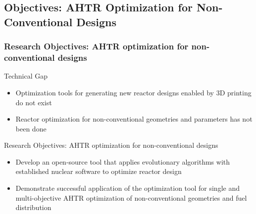 \subsection{Objectives: AHTR Optimization for Non-Conventional Designs}
\begin{frame}
    \frametitle{Research Objectives: AHTR optimization for non-conventional designs}
    \begin{block}{Technical Gap}
      \begin{itemize}
        \item Optimization tools for generating new reactor designs enabled by
        3D printing do not exist
        \item Reactor optimization for non-conventional geometries and parameters 
        has not been done 
      \end{itemize}
    \end{block}
    \begin{block}{Research Objectives: AHTR optimization for non-conventional designs}
        \begin{itemize}
            \item Develop an open-source tool that applies evolutionary algorithms 
            with established nuclear software to optimize reactor design
            \item Demonstrate successful application of the optimization tool 
            for single and multi-objective AHTR optimization of 
            non-conventional geometries and fuel distribution
        \end{itemize}
    \end{block}
  \end{frame}

